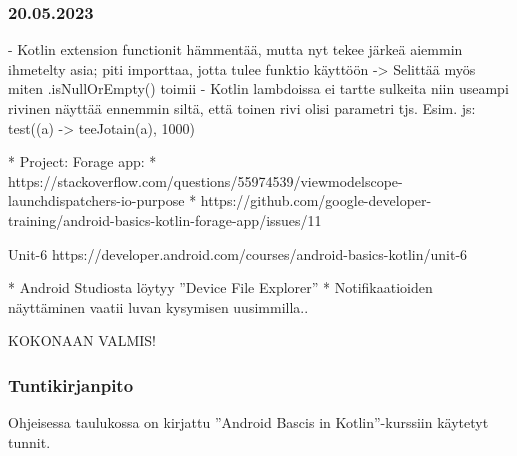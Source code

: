 \subsubsection{20.05.2023}

- Kotlin extension functionit hämmentää, mutta nyt tekee järkeä aiemmin ihmetelty asia; piti importtaa, jotta tulee funktio käyttöön
  -> Selittää myös miten .isNullOrEmpty() toimii
- Kotlin lambdoissa ei tartte sulkeita niin useampi rivinen näyttää ennemmin siltä, että toinen rivi olisi parametri tjs. Esim. js: test((a) -> teeJotain(a), 1000)

* Project: Forage app:
  * https://stackoverflow.com/questions/55974539/viewmodelscope-launchdispatchers-io-purpose
  * https://github.com/google-developer-training/android-basics-kotlin-forage-app/issues/11

Unit-6 https://developer.android.com/courses/android-basics-kotlin/unit-6

* Android Studiosta löytyy ''Device File Explorer''
* Notifikaatioiden näyttäminen vaatii luvan kysymisen uusimmilla..

KOKONAAN VALMIS!


\subsubsection{Tuntikirjanpito}

Ohjeisessa taulukossa on kirjattu ''Android Bascis in Kotlin''-kurssiin käytetyt tunnit.

